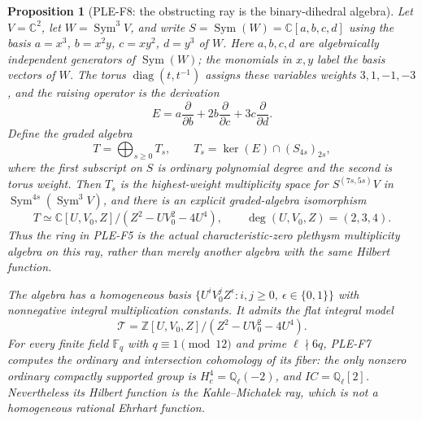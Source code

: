 \documentclass[11pt,a4paper]{article}
\newtheorem{proposition}{Proposition}[section]
\begin{document}
\begin{proposition}[PLE-F8: the obstructing ray is the binary-dihedral algebra]
\label{prop:actualplethysmalgebra}
Let $V=\mathbb C^2$, let $W=\operatorname{Sym}^3V$, and write
$S=\operatorname{Sym}(W)=\mathbb C[a,b,c,d]$ using the basis
$a=x^3$, $b=x^2y$, $c=xy^2$, $d=y^3$ of $W$.
Here $a,b,c,d$ are algebraically independent generators of
$\operatorname{Sym}(W)$; the monomials in $x,y$ label the basis
vectors of $W$.
The torus $\operatorname{diag}(t,t^{-1})$ assigns these variables
weights $3,1,-1,-3$, and the raising operator is the derivation
\[
 E=a\frac{\partial}{\partial b}
      +2b\frac{\partial}{\partial c}
      +3c\frac{\partial}{\partial d}.
\]
Define the graded algebra
\[
 T=\bigoplus_{s\ge0}T_s,\qquad
 T_s=\ker(E)\cap(S_{4s})_{2s},
 \tag{PLE-F8a}
\]
where the first subscript on $S$ is ordinary polynomial degree and
the second is torus weight. Then $T_s$ is the highest-weight
multiplicity space for
$S^{(7s,5s)}V$ in $\operatorname{Sym}^{4s}(\operatorname{Sym}^3V)$,
and there is an explicit graded-algebra isomorphism
\[
 T\simeq
 \mathbb C[U,V_0,Z]/(Z^2-UV_0^2-4U^4),
 \qquad \deg(U,V_0,Z)=(2,3,4).
 \tag{PLE-F8b}
\]
Thus the ring in PLE-F5 is the actual characteristic-zero plethysm
multiplicity algebra on this ray, rather than merely another algebra
with the same Hilbert function.

The algebra has a homogeneous basis
$\{U^iV_0^jZ^\epsilon:i,j\ge0,\ \epsilon\in\{0,1\}\}$
with nonnegative integral multiplication constants. It admits the
flat integral model
\[
 \mathcal T=\mathbb Z[U,V_0,Z]/(Z^2-UV_0^2-4U^4).
 \tag{PLE-F8c}
\]
For every finite field $\mathbb F_q$ with $q\equiv1\pmod{12}$
and prime $\ell\nmid6q$, PLE-F7 computes the ordinary and
intersection cohomology of its fiber: the only nonzero ordinary
compactly supported group is $H_c^4=\mathbb Q_\ell(-2)$, and
$IC=\mathbb Q_\ell[2]$. Nevertheless its Hilbert function is the
Kahle--Micha\l ek ray, which is not a homogeneous rational Ehrhart
function.
\end{proposition}
\end{document}
